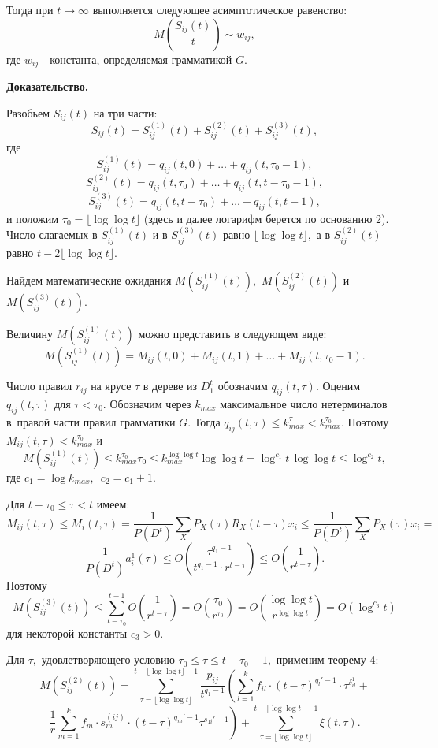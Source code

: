 \documentclass[12pt,russian]{article}
\begin{document}
{{Тогда при $t \rightarrow \infty $ выполняется следующее асимптотическое равенство:
$$
M\left(\frac{S_{ij}(t)}{t}\right) \sim w_{ij},
$$
где $w_{ij}$ - константа, определяемая грамматикой $G.$}
\medskip

{\bf Доказательство.}

Разобьем $S_{ij}(t)$ на три части:
$$
S_{ij}(t)=S_{ij}^{(1)}(t)+S_{ij}^{(2)}(t)+S_{ij}^{(3)}(t),
$$
где
$$
S_{ij}^{(1)}(t)=q_{ij}(t,0)+\ldots+q_{ij}(t,\tau_0-1),
$$
$$
S_{ij}^{(2)}(t)=q_{ij}(t,\tau_0)+\ldots+q_{ij}(t,t-\tau_0-1),
$$
$$
S_{ij}^{(3)}(t)=q_{ij}(t,t-\tau_0)+\ldots+q_{ij}(t,t-1),
$$
и положим $\tau_0=\lfloor \log\log t \rfloor$ (здесь и далее логарифм
берется по основанию 2).
Число слагаемых в $S_{ij}^{(1)}(t)$ и в $S_{ij}^{(3)}(t)$ равно
$\lfloor \log\log t \rfloor,$ а в $S_{ij}^{(2)}(t)$ равно
$t-2 \lfloor \log\log t \rfloor.$

Найдем математические ожидания $M\left(S_{ij}^{(1)}(t)\right),$
$M\left(S_{ij}^{(2)}(t)\right)$ и
$M\left(S_{ij}^{(3)}(t)\right).$

Величину $M\left(S_{ij}^{(1)}(t)\right)$ можно представить в следующем виде:
$$
M\left(S_{ij}^{(1)}(t)\right)=M_{ij}(t,0)+M_{ij}(t,1)+\ldots +
M_{ij}(t,\tau_0-1).
$$

Число правил $r_{ij}$ на ярусе $\tau$ в дереве из $D_1^t$ обозначим $q_{ij}(t,\tau).$
Оценим $q_{ij}(t,\tau)$ для $\tau < \tau_0.$
Обозначим через $k_{max}$ максимальное число нетерминалов в~правой части правил грамматики $G.$ Тогда
$q_{ij}(t,\tau)\leq k_{max}^{\tau}< k_{max}^{\tau_0}.$
Поэтому
$
M_{ij}(t,\tau)< k_{max}^{\tau_0}
$
и
$$
M\left(S_{ij}^{(1)}(t)\right)\leq k_{max}^{\tau_0}  \tau_0\leq
k_{max}^{\log \log t}
  \log \log t=\log^{c_1} t \,  \log \log t \leq \log^{c_2} t,
$$
где $c_1=\log k_{max},$ $\, c_2=c_1+1.$

Для $t-\tau_0 \leq \tau < t$ имеем:
$$
M_{ij}(t,\tau)\leq M_{i}(t,\tau) =
\frac 1 {P(D^t)} \sum_{X} P_X(\tau)   R_X(t-\tau)   x_i \leq
\frac{1}{P(D^t)} \sum_{X} P_X(\tau)   x_i=
$$
$$
\frac{1}{P(D^t)}  a^1_{i}(\tau)\le
O\left(\frac{\tau^{q_1-1}}{t^{q_1-1}\cdot r^{t-\tau}}\right)\le O\left(\frac 1{r^{t-\tau}}\right).
$$
Поэтому
$$
M\left(S_{ij}^{(3)}(t)\right) \leq
\sum_{t-\tau_0}^{t-1} O\left(\frac{1}{r^{t-\tau}}\right)
=O\left(\frac {\tau_0}{r^{\tau_0}}\right)
=O\left(\frac {\log \log t}{r^{\log \log t}}\right)=O\left(\log ^{c_3} t\right)
$$
для некоторой константы $c_3>0.$

Для $\tau,$ удовлетворяющего условию
$\tau_0 \leq \tau \leq t-\tau_0-1,$ применим теорему 4:
$$
M\left(S_{ij}^{(2)}(t)\right)=
\sum_{\tau=\lfloor \log\log t \rfloor}^{t-\lfloor \log\log t \rfloor-1} 
\frac{p_{ij}}{t^{q_1-1}} \left(\sum_{l =1}^k f_{il} \cdot (t-\tau)^{q_l'-1}\cdot \tau^{\delta_{il}^1}+ \right.
$$
$$
\left. \frac{1}{{r }} \sum_{m=1}^k f_m\cdot s_m^{(ij)}\cdot
(t-\tau)^{q_m'-1}\tau^{s_{1i}'-1}\right)+
\sum_{\tau=\lfloor \log\log t \rfloor}^{t-\lfloor \log\log t \rfloor-1} \xi(t,\tau). 
$$

}
\end{document}
